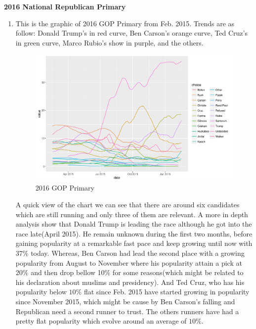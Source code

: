 \documentclass{article}[14pt]
\begin{document}
\begin{section}
{\bf \large 2016 National Republican Primary}

\begin{enumerate}[]

\item %

This is the graphic of 2016 GOP Primary from Feb. 2015. Trends are as follow: Donald Trump's in red curve, Ben Carson's orange curve, Ted Cruz's in green curve, Marco Rubio's show in purple, and the others.

\begin{figure}[h]
\begin{center}
\includegraphics[width=\linewidth]{gop}
\end{center}
\caption{2016 GOP Primary}
\label{fig:figure1}
\end{figure}

A quick view of the chart we can see that there are around six candidates which are still running and only three of them are  relevant. A more in depth analysis show that Donald Trump is leading the race although he got into the race late(April 2015).  He remain unknown during the first two months, before gaining  popularity at a remarkable fast pace and keep growing until now with   $37\%$ today. Whereas, Ben Carson  had lead the second place with a growing popularity from August  to November where his popularity attain a pick at $ 20 \%$ and then drop bellow 10\% for some reasons(which might be related to his declaration about muslims and presidency). And Ted Cruz, who has his popularity below $10\%$ flat since Feb. 2015 have started growing in popularity since November 2015, which might be cause by Ben Carson's falling and Republican need a second runner to trust. The others runners have had a pretty flat popularity which evolve around an average of $10\%$.


\end{enumerate}
\end{section}
\end{document}
